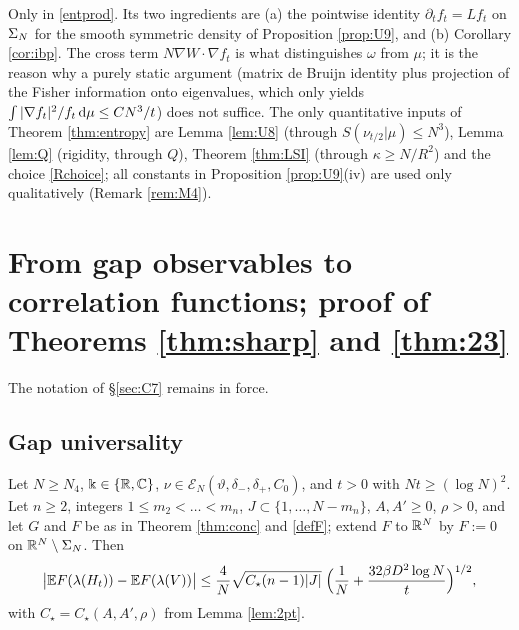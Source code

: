 \begin{remark}\label{rem:dyn}
Only in \eqref{entprod}. Its two ingredients are (a) the pointwise identity $\partial_tf_t=Lf_t$ on $\Sigma_N$ for the smooth symmetric density of Proposition \ref{prop:U9}, and (b) Corollary \ref{cor:ibp}.
The cross term $N\nabla W\cdot\nabla f_t$ is what distinguishes $\omega$ from $\mu$; it is the reason why a purely static argument (matrix de Bruijn identity plus projection of the Fisher information onto eigenvalues, which only yields $\int|\nabla f_t|^2/f_t\,\mathrm{d}\mu\le CN^3/t$) does not suffice.
The only quantitative inputs of Theorem \ref{thm:entropy} are Lemma \ref{lem:U8} (through $S(\nu_{t/2}|\mu)\le N^3$), Lemma \ref{lem:Q} (rigidity, through $Q$), Theorem \ref{thm:LSI} (through $\kappa\ge N/R^2$) and the choice \eqref{Rchoice}; all constants in Proposition \ref{prop:U9}(iv) are used only qualitatively (Remark \ref{rem:M4}).
\end{remark}
\section[From gap observables to correlation functions; proof of Theorems \ref*{thm:sharp} and \ref*{thm:23}]{From gap observables to correlation functions; proof of Theorems \texorpdfstring{\ref{thm:sharp}}{12.1} and \ref{thm:23}}\label{sec:C8}

The notation of \S\ref{sec:C7} remains in force.

\subsection{Gap universality}

\begin{proposition}\label{prop:gapuniv}
Let $N\ge N_4$, $\Bbbk\in\{\mathbb{R},\mathbb{C}\}$, $\nu\in\mathcal E_N(\vartheta,\delta_-,\delta_+,C_0)$, and $t>0$ with $Nt\ge(\log N)^2$. Let $n\ge2$, integers $1\le m_2<\dots<m_n$, $J\subset\{1,\dots,N-m_n\}$, $A,A'\ge0$, $\rho>0$, and let $G$ and $F$ be as in Theorem \ref{thm:conc} and \eqref{defF}; extend $F$ to $\mathbb{R}^N$ by $F:=0$ on $\mathbb{R}^N\setminus\Sigma_N$. Then
\begin{equation}\label{gapuniv}
\big|\mathbb{E} F(\lambda(H_t))-\mathbb{E} F(\lambda(V))\big|\le\frac{4}{N}\sqrt{C_\star(n-1)|J|}\;\Big(\frac1N+\frac{32\beta D^2\log N}{t}\Big)^{1/2},
\end{equation}
with $C_\star=C_\star(A,A',\rho)$ from Lemma \ref{lem:2pt}.
\end{proposition}

